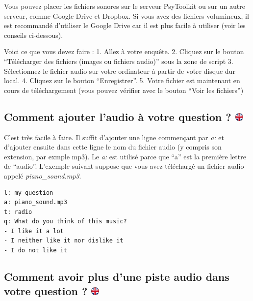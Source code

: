 \documentclass[
]{book}
\begin{document}
Vous pouvez placer les fichiers sonores sur le serveur PsyToolkit ou sur un autre serveur, comme Google Drive et Dropbox. Si vous avez des fichiers volumineux, il est recommandé d'utiliser le Google Drive car il est plus facile à utiliser (voir les conseils ci-dessous).

Voici ce que vous devez faire :
1. Allez à votre enquête.
2. Cliquez sur le bouton ``Télécharger des fichiers (images ou fichiers audio)'' sous la zone de script
3. Sélectionnez le fichier audio sur votre ordinateur à partir de votre disque dur local.
4. Cliquez sur le bouton ``Enregistrer''.
5. Votre fichier est maintenant en cours de téléchargement (vous pouvez vérifier avec le bouton ``Voir les fichiers'')

\hypertarget{comment-ajouter-laudio-uxe0-votre-question}{%
\subsection[Comment ajouter l'audio à votre question ? ]{\texorpdfstring{Comment ajouter l'audio à votre question ? \href{https://www.psytoolkit.org/lessons/surveyaudiovideo.html\#_how_to_add_the_audio_to_your_question}{\protect\includegraphics{img/ukflag.png}}}{Comment ajouter l'audio à votre question ? }}\label{comment-ajouter-laudio-uxe0-votre-question}}

C'est très facile à faire. Il suffit d'ajouter une ligne commençant par \emph{a:} et d'ajouter ensuite dans cette ligne le nom du fichier audio (y compris son extension, par exmple mp3). Le \emph{a:} est utilisé parce que ``a'' est la première lettre de ``audio''. L'exemple suivant suppose que vous avez téléchargé un fichier audio appelé \emph{piano\_sound.mp3}.

\begin{verbatim}
l: my_question
a: piano_sound.mp3
t: radio
q: What do you think of this music?
- I like it a lot
- I neither like it nor dislike it
- I do not like it
\end{verbatim}

\hypertarget{comment-avoir-plus-dune-piste-audio-dans-votre-question}{%
\subsection[Comment avoir plus d'une piste audio dans votre question ? ]{\texorpdfstring{Comment avoir plus d'une piste audio dans votre question ? \href{https://www.psytoolkit.org/lessons/surveyaudiovideo.html\#_how_to_have_more_than_one_audio_track_in_your_question}{\protect\includegraphics{img/ukflag.png}}}{Comment avoir plus d'une piste audio dans votre question ? }}\label{comment-avoir-plus-dune-piste-audio-dans-votre-question}}
\end{document}
